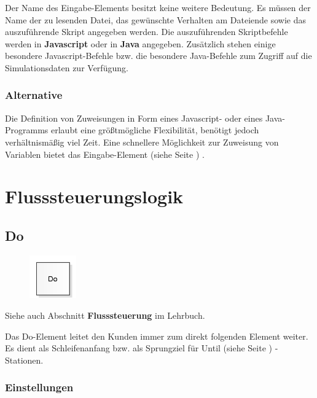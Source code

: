 Der Name des Eingabe-Elements besitzt keine weitere Bedeutung. Es müssen der Name der zu lesenden
Datei, das gewünschte Verhalten am Dateiende sowie das auszuführende Skript angegeben werden.
Die auszuführenden Skriptbefehle werden in \textbf{Javascript} oder in \textbf{Java} angegeben.
Zusätzlich stehen einige besondere Javascript-Befehle bzw.
die besondere Java-Befehle 
zum Zugriff auf die Simulationsdaten zur Verfügung.

\subsection*{Alternative}

Die Definition von Zuweisungen in Form eines Javascript- oder eines Java-Programms erlaubt eine größtmögliche Flexibilität,
benötigt jedoch verhältnismäßig viel Zeit. Eine schnellere Möglichkeit zur Zuweisung von Variablen
bietet das Eingabe-Element (siehe Seite \pageref{ref:ModelElementInput}) .





\chapter{Flusssteuerungslogik}

\section{Do}
\label{ref:ModelElementLogicDo}

\begin{figure}
\vspace{-22pt}
\includegraphics[width=2cm]{imageModelElementLogicDo.png}
\vspace{-22pt}
\end{figure}

Siehe auch Abschnitt \textbf{Flusssteuerung} im Lehrbuch.

Das Do-Element leitet den Kunden immer zum direkt folgenden Element weiter.
Es dient als Schleifenanfang bzw. als Sprungziel für
Until (siehe Seite \pageref{ref:ModelElementLogicUntil}) -Stationen.

\subsection*{Einstellungen}

